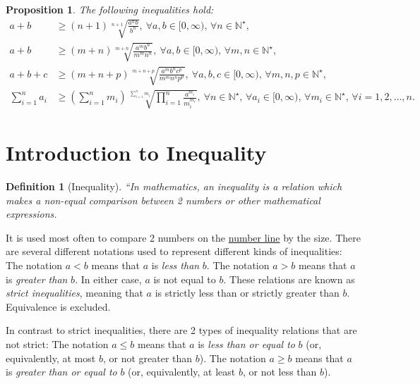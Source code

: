 \documentclass{article}
\newtheorem{definition}{Definition}
\newtheorem{proposition}{Proposition}
\begin{document}
\begin{proposition}
	The following inequalities hold:
	\begin{align}
		a + b&\ge(n + 1)\sqrt[n + 1]{\frac{a^nb}{b^n}},\ \forall a,b\in[0,\infty),\,\forall n\in\mathbb{N}^\star,\\
		a + b&\ge(m + n)\sqrt[m + n]{\frac{a^mb^n}{m^mn^n}},\ \forall a,b\in[0,\infty),\,\forall m,n\in\mathbb{N}^\star,\\
		a + b + c&\ge(m + n + p)\sqrt[m + n+ p]{\frac{a^mb^nc^p}{m^mn^np^p}},\ \forall a,b,c\in[0,\infty),\,\forall m,n,p\in\mathbb{N}^\star,\\
		\sum_{i=1}^n a_i&\ge\left(\sum_{i=1}^n m_i\right)\sqrt[\sum_{i=1}^n m_i]{\prod_{i=1}^n \frac{a^{m_i}}{m_i^{m_i}}},\ \forall n\in\mathbb{N}^\star,\,\forall a_i\in[0,\infty),\,\forall m_i\in\mathbb{N}^\star,\,\forall i = 1,2,\ldots,n.
	\end{align}
\end{proposition}



\section{Introduction to Inequality}

\begin{definition}[Inequality]
	``In mathematics, an \emph{inequality} is a relation which makes a non-equal comparison between 2 numbers or other mathematical expressions.
\end{definition}
It is used most often to compare 2 numbers on the \href{https://en.wikipedia.org/wiki/Number_line}{number line} by the size. There are several different notations used to represent different kinds of inequalities: The notation $a < b$ means that $a$ is \textit{less than} $b$. The notation $a > b$ means that $a$ is \textit{greater than} $b$. In either case, $a$ is not equal to $b$. These relations are known as \textit{strict inequalities}, meaning that $a$ is strictly less than or strictly greater than $b$. Equivalence is excluded.

In contrast to strict inequalities, there are 2 types of inequality relations that are not strict: The notation $a\le b$ means that $a$ is \textit{less than or equal to} $b$ (or, equivalently, at most $b$, or not greater than $b$). The notation $a\ge b$ means that $a$ is \textit{greater than or equal to} $b$ (or, equivalently, at least $b$, or not less than $b$).
\end{document}
